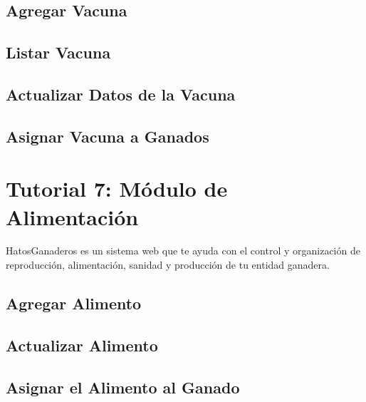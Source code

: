 \documentclass[letterpaper,10pt,english]{sphinxmanual}
\begin{document}
\subsection{Agregar Vacuna}
\label{Tutorial 6: M_xf3dulo de Sanidad:agregar-vacuna}

\subsection{Listar Vacuna}
\label{Tutorial 6: M_xf3dulo de Sanidad:listar-vacuna}

\subsection{Actualizar Datos de la Vacuna}
\label{Tutorial 6: M_xf3dulo de Sanidad:actualizar-datos-de-la-vacuna}

\subsection{Asignar Vacuna a Ganados}
\label{Tutorial 6: M_xf3dulo de Sanidad:asignar-vacuna-a-ganados}

\section{Tutorial 7: Módulo de Alimentación}
\label{Tutorial 7: M_xf3dulo de Alimentaci_xf3n:tutorial-7-modulo-de-alimentacion}\label{Tutorial 7: M_xf3dulo de Alimentaci_xf3n::doc}
HatosGanaderos es un sistema web que te ayuda con el control y organización de reproducción, alimentación, sanidad y producción de tu entidad ganadera.


\subsection{Agregar Alimento}
\label{Tutorial 7: M_xf3dulo de Alimentaci_xf3n:agregar-alimento}

\subsection{Actualizar Alimento}
\label{Tutorial 7: M_xf3dulo de Alimentaci_xf3n:actualizar-alimento}

\subsection{Asignar el Alimento al Ganado}
\label{Tutorial 7: M_xf3dulo de Alimentaci_xf3n:asignar-el-alimento-al-ganado}
\end{document}
